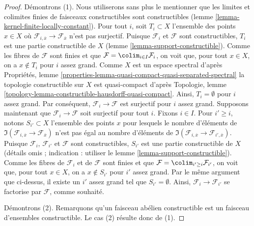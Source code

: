 \begin{proof}
Démontrons (1). Nous utiliserons sans plus le mentionner que les limites
et colimites finies de faisceaux constructibles sont constructibles
(lemme \ref{lemma-kernel-finite-locally-constant}).
Pour tout $i$, soit $T_i \subset X$ l'ensemble des points $x \in X$
où $\mathcal{F}_{i, \overline{x}} \to \mathcal{F}_{\overline{x}}$
n'est pas surjectif. Puisque $\mathcal{F}_i$ et $\mathcal{F}$ sont
constructibles, $T_i$ est une partie constructible de $X$
(lemme \ref{lemma-support-constructible}).
Comme les fibres de $\mathcal{F}$ sont finies
et que $\mathcal{F} = \colim_{i \in I} \mathcal{F}_i$, on voit
que, pour tout $x \in X$, on a $x \not \in T_i$ pour $i$ assez grand.
Comme $X$ est un espace spectral d'après Propriétés, lemme
\ref{properties-lemma-quasi-compact-quasi-separated-spectral}
la topologie constructible sur $X$ est quasi-compact d'après
Topologie, lemme \ref{topology-lemma-constructible-hausdorff-quasi-compact}.
Ainsi, $T_i = \emptyset$ pour $i$ assez grand. Par conséquent,
$\mathcal{F}_i \to \mathcal{F}$ est surjectif pour $i$ assez grand.
Supposons maintenant que $\mathcal{F}_i \to \mathcal{F}$ soit surjectif pour tout $i$.
Fixons $i \in I$. Pour $i' \geq i$, notons $S_{i'} \subset X$ l'ensemble des
points $x$ pour lesquels le nombre d'éléments de
$\Im(\mathcal{F}_{i, \overline{x}} \to \mathcal{F}_{\overline{x}})$
n'est pas égal au nombre d'éléments de
$\Im(\mathcal{F}_{i, \overline{x}} \to \mathcal{F}_{i', \overline{x}})$.
Puisque $\mathcal{F}_i$, $\mathcal{F}_{i'}$ et $\mathcal{F}$ sont
constructibles, $S_{i'}$ est une partie constructible de $X$
(détails omis ; indication : utiliser le lemme \ref{lemma-support-constructible}).
Comme les fibres de $\mathcal{F}_i$ et de $\mathcal{F}$
sont finies et que $\mathcal{F} = \colim_{i' \geq i} \mathcal{F}_{i'}$,
on voit que, pour tout $x \in X$, on a $x \not \in S_{i'}$ pour $i'$
assez grand. Par le même argument que ci-dessus, il existe un $i'$ assez grand
tel que $S_{i'} = \emptyset$. Ainsi, $\mathcal{F}_i \to \mathcal{F}_{i'}$
se factorise par $\mathcal{F}$, comme souhaité.

\medskip\noindent
Démontrons (2). Remarquons qu'un faisceau abélien constructible est un faisceau
d'ensembles constructible. Le cas (2) résulte donc de (1).


\end{proof}
